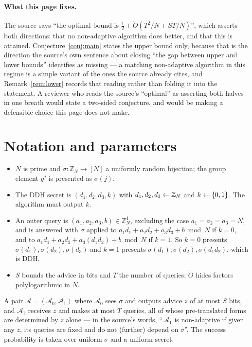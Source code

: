\documentclass{aicr-conjecture}
\newcommand{\Adv}{\mathcal{A}}
\newcommand{\Z}{\mathbb{Z}}
\newcommand{\Ot}{\widetilde{O}}
\newcommand{\bits}{\{0,1\}}
\begin{document}
\paragraph{What this page fixes.}
The source says ``the optimal bound is $\tfrac{1}{2} + \Ot(T^{2}/N +
ST/N)$'', which asserts both directions: that no non-adaptive algorithm
does better, and that this is attained. Conjecture~\ref{conj:main}
states the upper bound only, because that is the direction the source's
own sentence about closing ``the gap between upper and lower bounds''
identifies as missing --- a matching non-adaptive algorithm in this
regime is a simple variant of the ones the source already cites, and
Remark~\ref{rem:lower} records that reading rather than folding it into
the statement. A reviewer who reads the source's ``optimal'' as
asserting both halves in one breath would state a two-sided conjecture,
and would be making a defensible choice this page does not make.

\section{Notation and parameters}\label{sec:notation}

\begin{itemize}[nosep]
  \item $N$ is prime and $\sigma : \Z_{N} \to [N]$ a uniformly random
    bijection; the group element $g^{j}$ is presented as $\sigma(j)$.
  \item The DDH secret is $(d_{1}, d_{2}, d_{3}, k)$ with
    $d_{1}, d_{2}, d_{3} \sample \Z_{N}$ and $k \sample \bits$. The
    algorithm must output $k$.
  \item An outer query is $(a_{1}, a_{2}, a_{3}, b) \in \Z_{N}^{4}$,
    excluding the case $a_{1} = a_{2} = a_{3} = N$, and is answered
    with $\sigma$ applied to
    $a_{1} d_{1} + a_{2} d_{2} + a_{3} d_{3} + b \bmod N$ if $k = 0$,
    and to
    $a_{1} d_{1} + a_{2} d_{2} + a_{3} (d_{1} d_{2}) + b \bmod N$ if
    $k = 1$. So $k = 0$ presents
    $\sigma(d_{1}), \sigma(d_{2}), \sigma(d_{3})$ and $k = 1$ presents
    $\sigma(d_{1}), \sigma(d_{2}), \sigma(d_{1} d_{2})$, which is DDH\@.
  \item $S$ bounds the advice in bits and $T$ the number of queries;
    $\Ot$ hides factors polylogarithmic in $N$.
\end{itemize}

\begin{definition}\label{def:na}
A pair $\Adv = (\Adv_{0}, \Adv_{1})$ where $\Adv_{0}$ sees $\sigma$ and
outputs advice $z$ of at most $S$ bits, and $\Adv_{1}$ receives $z$ and
makes at most $T$ queries, all of whose pre-translated forms are
determined by $z$ alone --- in the source's words, ``\,$\Adv_{1}$ is
non-adaptive if given any $z$, its queries are fixed and do not
(further) depend on $\sigma$''. The success probability is taken over
uniform $\sigma$ and a uniform secret.
\end{definition}
\end{document}
